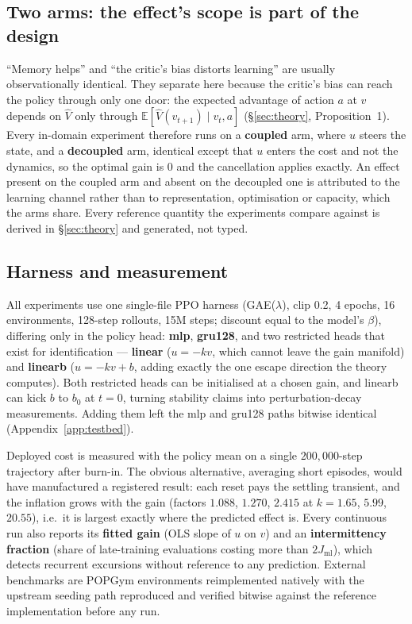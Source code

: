 \subsection{Two arms: the effect's scope is part of the design}

``Memory helps'' and ``the critic's bias distorts learning'' are usually
observationally identical. They separate here because the critic's bias can
reach the policy through only one door: the expected advantage of action $a$
at $v$ depends on $\hat V$ only through $\mathbb{E}[\hat V(v_{t+1})\mid v_t,a]$
(\S\ref{sec:theory}, Proposition~1). Every in-domain experiment therefore runs
on a \textbf{coupled} arm, where $u$ steers the state, and a \textbf{decoupled}
arm, identical except that $u$ enters the cost and not the dynamics, so the
optimal gain is $0$ and the cancellation applies exactly. An effect present on
the coupled arm and absent on the decoupled one is attributed to the learning
channel rather than to representation, optimisation or capacity, which the
arms share. Every reference quantity the experiments compare against is
derived in \S\ref{sec:theory} and generated, not typed.

\subsection{Harness and measurement}

All experiments use one single-file PPO harness \citep{schulman2017ppo}
(GAE($\lambda$), clip 0.2, 4 epochs, 16 environments, 128-step rollouts,
15M steps; discount equal to the model's $\beta$), differing only in the policy
head: \textbf{mlp}, \textbf{gru128}, and two restricted heads that exist for
identification --- \textbf{linear} ($u=-kv$, which cannot leave the gain
manifold) and \textbf{linearb} ($u=-kv+b$, adding exactly the one escape
direction the theory computes). Both restricted heads can be initialised at a
chosen gain, and linearb can kick $b$ to $b_0$ at $t=0$, turning stability
claims into perturbation-decay measurements. Adding them left the mlp and
gru128 paths bitwise identical (Appendix~\ref{app:testbed}).

Deployed cost is measured with the policy mean on a single $200{,}000$-step
trajectory after burn-in. The obvious alternative, averaging short episodes,
would have manufactured a registered result: each reset pays the settling
transient, and the inflation grows with the gain (factors $1.088$, $1.270$,
$2.415$ at $k=1.65$, $5.99$, $20.55$), i.e.\ it is largest exactly where the
predicted effect is. Every continuous run also reports its \textbf{fitted
gain} (OLS slope of $u$ on $v$) and an \textbf{intermittency fraction} (share
of late-training evaluations costing more than $2J_{\mathrm{ml}}$), which
detects recurrent excursions without reference to any prediction. External
benchmarks are POPGym environments reimplemented natively with the upstream
seeding path reproduced and verified bitwise against the reference
implementation before any run.

